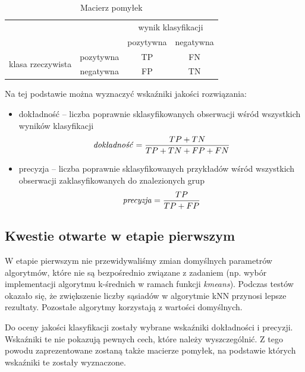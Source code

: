 \documentclass[11pt,a4paper,twoside]{article}
\begin{document}
\begin{table}[ht]
\centering
\caption{Macierz pomyłek}
\label{confusionMatrix}
\begin{tabular}{|*{4}{c|}}
\cline{3-4}
  \multicolumn{2}{c}{} & \multicolumn{2}{|c|}{wynik klasyfikacji}\\\cline{3-4}
  \multicolumn{2}{c|}{} & pozytywna & negatywna\\\hline
  \multirow{2}{*}{klasa rzeczywista}& pozytywna & TP & FN\\\cline{2-4}
  & negatywna & FP & TN\\\hline
\end{tabular}
\end{table}

Na tej podstawie można wyznaczyć wskaźniki jakości rozwiązania:
\begin{itemize}[label={--}]
\item dokładność -- liczba poprawnie sklasyfikowanych obserwacji wśród wszystkich wyników klasyfikacji $$\text{\emph{dokładność}} = \frac{TP+TN}{TP+TN+FP+FN}$$
\item precyzja -- liczba poprawnie sklasyfikowanych przykładów wśród wszystkich obserwacji zaklasyfikowanych do znalezionych grup $$\text{\emph{precyzja}} = \frac{TP}{TP+FP}$$
\end{itemize}


\subsection{Kwestie otwarte w etapie pierwszym}
W etapie pierwszym nie przewidywaliśmy zmian domyślnych parametrów algorytmów, które nie są bezpośrednio związane z zadaniem (np. wybór implementacji algorytmu k-średnich w ramach funkcji \textit{kmeans}). Podczas testów okazało się, że zwiększenie liczby sąsiadów w algorytmie kNN przynosi lepsze rezultaty. Pozostałe algorytmy korzystają z wartości domyślnych.

Do oceny jakości klasyfikacji zostały wybrane wskaźniki dokładności i precyzji. Wskaźniki te nie pokazują pewnych cech, które należy wyszczególnić. Z tego powodu zaprezentowane zostaną także macierze pomyłek, na podstawie których wskaźniki te zostały wyznaczone.
\end{document}
